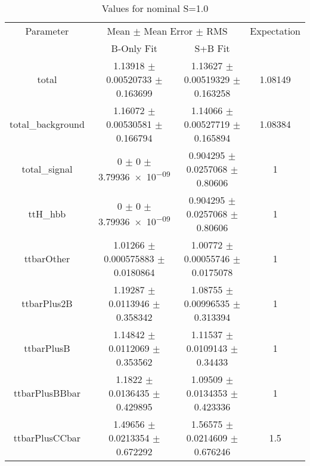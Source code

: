 \begin{table}
\centering
\caption{Values for nominal S=1.0}
\begin{tabular}{cccc}
\toprule
Parameter & \multicolumn{2}{c}{Mean $\pm$ Mean Error $\pm$ RMS} & Expectation\\
 & B-Only Fit & S+B Fit & \\
\midrule
total & \num{1.13918} $\pm$ \num{0.00520733} $\pm$ \num{0.163699} & \num{1.13627} $\pm$ \num{0.00519329} $\pm$ \num{0.163258} & \num{1.08149}\\
total\_background & \num{1.16072} $\pm$ \num{0.00530581} $\pm$ \num{0.166794} & \num{1.14066} $\pm$ \num{0.00527719} $\pm$ \num{0.165894} & \num{1.08384}\\
total\_signal & \num{0} $\pm$ \num{0} $\pm$ \num{3.79936e-09} & \num{0.904295} $\pm$ \num{0.0257068} $\pm$ \num{0.80606} & \num{1}\\
ttH\_hbb & \num{0} $\pm$ \num{0} $\pm$ \num{3.79936e-09} & \num{0.904295} $\pm$ \num{0.0257068} $\pm$ \num{0.80606} & \num{1}\\
ttbarOther & \num{1.01266} $\pm$ \num{0.000575883} $\pm$ \num{0.0180864} & \num{1.00772} $\pm$ \num{0.00055746} $\pm$ \num{0.0175078} & \num{1}\\
ttbarPlus2B & \num{1.19287} $\pm$ \num{0.0113946} $\pm$ \num{0.358342} & \num{1.08755} $\pm$ \num{0.00996535} $\pm$ \num{0.313394} & \num{1}\\
ttbarPlusB & \num{1.14842} $\pm$ \num{0.0112069} $\pm$ \num{0.353562} & \num{1.11537} $\pm$ \num{0.0109143} $\pm$ \num{0.34433} & \num{1}\\
ttbarPlusBBbar & \num{1.1822} $\pm$ \num{0.0136435} $\pm$ \num{0.429895} & \num{1.09509} $\pm$ \num{0.0134353} $\pm$ \num{0.423336} & \num{1}\\
ttbarPlusCCbar & \num{1.49656} $\pm$ \num{0.0213354} $\pm$ \num{0.672292} & \num{1.56575} $\pm$ \num{0.0214609} $\pm$ \num{0.676246} & \num{1.5}\\
\bottomrule
\end{tabular}
\end{table}
